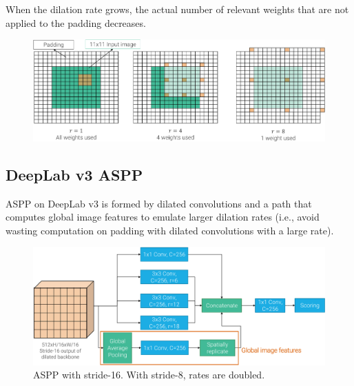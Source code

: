 \begin{subappendices}
    \begin{remark}
        When the dilation rate grows, the actual number of relevant weights that are not applied to the padding decreases.

        \begin{figure}[H]
            \centering
            \includegraphics[width=0.8\linewidth]{./img/_dilated_conv_weights.pdf}
        \end{figure}
    \end{remark}


    \subsection{DeepLab v3 ASPP}

    ASPP on DeepLab v3 is formed by dilated convolutions and a path that computes global image features to emulate larger dilation rates (i.e., avoid wasting computation on padding with dilated convolutions with a large rate).

    \begin{figure}[H]
        \centering
        \includegraphics[width=0.75\linewidth]{./img/_deeplabv3_aspp.pdf}
        \caption{
            ASPP with stride-16. With stride-8, rates are doubled.
        }
    \end{figure}
\end{subappendices}
